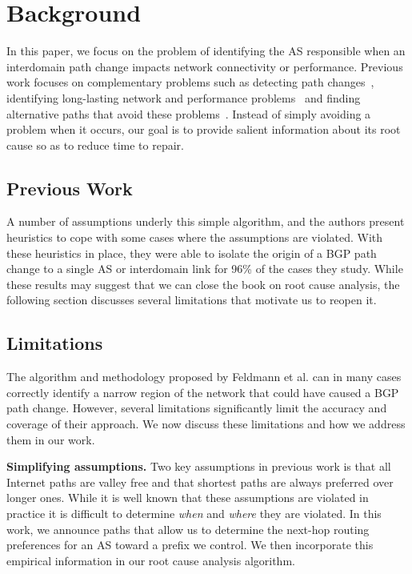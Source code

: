\section{Background}
\label{sec:bg}
In this paper, we focus on the problem of identifying the AS 
responsible when an interdomain path change impacts 
network connectivity or performance. Previous work focuses 
on complementary problems such as detecting path 
changes~\cite{feamster,beacons}, identifying long-lasting network and performance problems~\cite{hubble,planetseer,netdiagnoser,news} 
and finding alternative paths that avoid these problems~\cite{ron,lifeguard}. 
Instead of simply avoiding a problem when it occurs, our goal is to 
provide salient information about its root cause so as to reduce time to repair.

\subsection{Previous Work}

A number of assumptions underly this simple algorithm, and the authors 
present heuristics to cope with some cases where the assumptions are 
violated. With these heuristics in place, they were able to isolate the origin 
of a BGP path change to a single AS or interdomain link for 96\% of 
the cases they study. While these results may suggest that we can close 
the book on root cause analysis, the following section discusses 
several limitations that motivate us to reopen it.
  
\subsection{Limitations}

The algorithm and methodology proposed by Feldmann et al. 
can in many cases correctly identify a narrow region of the network 
that could have caused a BGP path change. However, several 
limitations significantly limit the accuracy and coverage of their 
approach. We now discuss these limitations and how we address 
them in our work.

\textbf{Simplifying assumptions.} Two key assumptions in 
previous work is that all Internet paths are valley free and 
that shortest paths are always preferred over longer ones. 
While it is well known that these assumptions are violated in 
practice it is difficult to determine \emph{when} and \emph{where} 
they are violated. In this work, we announce paths that allow 
us to determine the next-hop routing preferences for an AS toward 
a prefix we control. We then incorporate this empirical information 
in our root cause analysis algorithm. 

